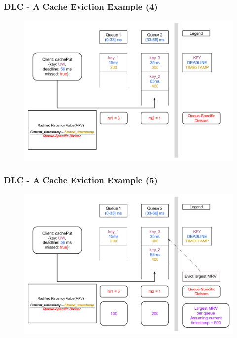 \documentclass{beamer}
\begin{document}
\begin{frame}
  \frametitle{DLC - A Cache Eviction Example (4)}
  \begin{figure}
    \begin{center}
      \centerline{\includegraphics[scale=0.33]{img/DLC_V6_4.png}}
    \end{center}
  \end{figure}
\end{frame}


\begin{frame}
  \frametitle{DLC - A Cache Eviction Example (5)}
  \begin{figure}
    \begin{center}
      \centerline{\includegraphics[scale=0.33]{img/DLC_V6_5.png}}
    \end{center}
  \end{figure}
\end{frame}
\end{document}
